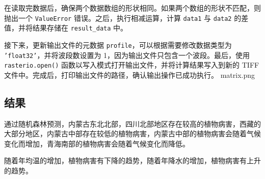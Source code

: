 \documentclass{article}
\begin{document}
在读取完数据后，确保两个数据数组的形状相同。如果两个数组的形状不匹配，则抛出一个 \texttt{ValueError} 错误。之后，执行相减运算，计算 \texttt{data1} 与 \texttt{data2} 的差值，并将结果存储在 \texttt{result\_data} 中。

接下来，更新输出文件的元数据 \texttt{profile}，可以根据需要修改数据类型为 \texttt{'float32'}，并将波段数设置为 1，因为输出文件只包含一个波段。最后，使用 \texttt{rasterio.open()} 函数以写入模式打开输出文件，并将计算结果写入到新的 TIFF 文件中。完成后，打印输出文件的路径，确认输出操作已成功执行。
matrix.png

\subsection{结果}
通过随机森林预测，内蒙古东北北部，四川北部地区存在较高的植物病害，西藏的大部分地区，内蒙古中部存在较低的植物病害，内蒙古中部的植物病害会随着气候变化而增加，青海南部的植物病害会随着气候变化而降低。

随着年均温的增加，植物病害有下降的趋势，随着年降水的增加，植物病害有上升的趋势。
\end{document}

